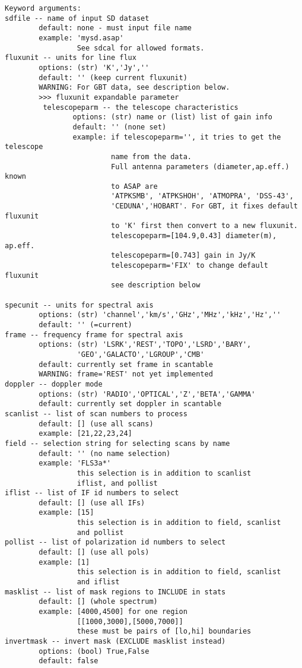 \begin{verbatim}
Keyword arguments:
sdfile -- name of input SD dataset
        default: none - must input file name
        example: 'mysd.asap'
                 See sdcal for allowed formats.
fluxunit -- units for line flux
        options: (str) 'K','Jy',''
        default: '' (keep current fluxunit)
        WARNING: For GBT data, see description below.
        >>> fluxunit expandable parameter
         telescopeparm -- the telescope characteristics
                options: (str) name or (list) list of gain info
                default: '' (none set)
                example: if telescopeparm='', it tries to get the telescope
                         name from the data.
                         Full antenna parameters (diameter,ap.eff.) known
                         to ASAP are
                         'ATPKSMB', 'ATPKSHOH', 'ATMOPRA', 'DSS-43',
                         'CEDUNA','HOBART'. For GBT, it fixes default fluxunit
                         to 'K' first then convert to a new fluxunit.
                         telescopeparm=[104.9,0.43] diameter(m), ap.eff.
                         telescopeparm=[0.743] gain in Jy/K
                         telescopeparm='FIX' to change default fluxunit
                         see description below

specunit -- units for spectral axis
        options: (str) 'channel','km/s','GHz','MHz','kHz','Hz',''
        default: '' (=current)
frame -- frequency frame for spectral axis
        options: (str) 'LSRK','REST','TOPO','LSRD','BARY',
                 'GEO','GALACTO','LGROUP','CMB'
        default: currently set frame in scantable
        WARNING: frame='REST' not yet implemented
doppler -- doppler mode
        options: (str) 'RADIO','OPTICAL','Z','BETA','GAMMA'
        default: currently set doppler in scantable
scanlist -- list of scan numbers to process
        default: [] (use all scans)
        example: [21,22,23,24]
field -- selection string for selecting scans by name
        default: '' (no name selection)
        example: 'FLS3a*'
                 this selection is in addition to scanlist
                 iflist, and pollist
iflist -- list of IF id numbers to select
        default: [] (use all IFs)
        example: [15]
                 this selection is in addition to field, scanlist
                 and pollist
pollist -- list of polarization id numbers to select
        default: [] (use all pols)
        example: [1]
                 this selection is in addition to field, scanlist
                 and iflist
masklist -- list of mask regions to INCLUDE in stats
        default: [] (whole spectrum)
        example: [4000,4500] for one region
                 [[1000,3000],[5000,7000]]
                 these must be pairs of [lo,hi] boundaries
invertmask -- invert mask (EXCLUDE masklist instead)
        options: (bool) True,False
        default: false


\end{verbatim}
